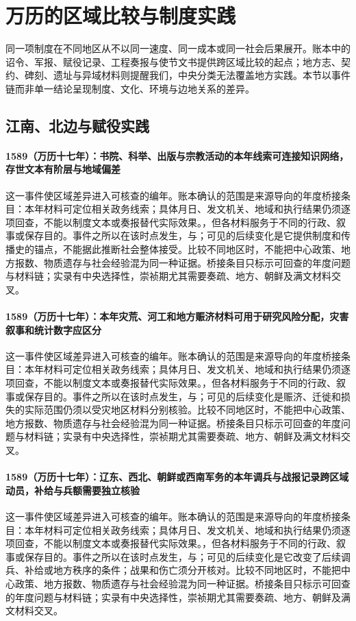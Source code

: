 \section{万历的区域比较与制度实践}

同一项制度在不同地区从不以同一速度、同一成本或同一社会后果展开。账本中的诏令、军报、赋役记录、工程奏报与使节文书提供跨区域比较的起点；地方志、契约、碑刻、遗址与异域材料则提醒我们，中央分类无法覆盖地方实践。本节以事件链而非单一结论呈现制度、文化、环境与边地关系的差异。

\subsection{江南、北边与赋役实践}

\paragraph{1589（万历十七年）：书院、科举、出版与宗教活动的本年线索可连接知识网络，存世文本有阶层与地域偏差} 这一事件使区域差异进入可核查的编年。账本确认的范围是来源导向的年度桥接条目：本年材料可定位相关政务线索；具体月日、发文机关、地域和执行结果仍须逐项回查，不能以制度文本或奏报替代实际效果。，但各材料服务于不同的行政、叙事或保存目的。事件之所以在该时点发生，与；可见的后续变化是它提供制度和传播史的锚点，不能据此推断社会整体接受。比较不同地区时，不能把中心政策、地方报数、物质遗存与社会经验混为同一种证据。桥接条目只标示可回查的年度问题与材料链；实录有中央选择性，崇祯期尤其需要奏疏、地方、朝鲜及满文材料交叉。

\paragraph{1589（万历十七年）：本年灾荒、河工和地方赈济材料可用于研究风险分配，灾害叙事和统计数字应区分} 这一事件使区域差异进入可核查的编年。账本确认的范围是来源导向的年度桥接条目：本年材料可定位相关政务线索；具体月日、发文机关、地域和执行结果仍须逐项回查，不能以制度文本或奏报替代实际效果。，但各材料服务于不同的行政、叙事或保存目的。事件之所以在该时点发生，与；可见的后续变化是赈济、迁徙和损失的实际范围仍须以受灾地区材料分别核验。比较不同地区时，不能把中心政策、地方报数、物质遗存与社会经验混为同一种证据。桥接条目只标示可回查的年度问题与材料链；实录有中央选择性，崇祯期尤其需要奏疏、地方、朝鲜及满文材料交叉。

\paragraph{1589（万历十七年）：辽东、西北、朝鲜或西南军务的本年调兵与战报记录跨区域动员，补给与兵额需要独立核验} 这一事件使区域差异进入可核查的编年。账本确认的范围是来源导向的年度桥接条目：本年材料可定位相关政务线索；具体月日、发文机关、地域和执行结果仍须逐项回查，不能以制度文本或奏报替代实际效果。，但各材料服务于不同的行政、叙事或保存目的。事件之所以在该时点发生，与；可见的后续变化是它改变了后续调兵、补给或地方秩序的条件；战果和伤亡须分开核对。比较不同地区时，不能把中心政策、地方报数、物质遗存与社会经验混为同一种证据。桥接条目只标示可回查的年度问题与材料链；实录有中央选择性，崇祯期尤其需要奏疏、地方、朝鲜及满文材料交叉。

